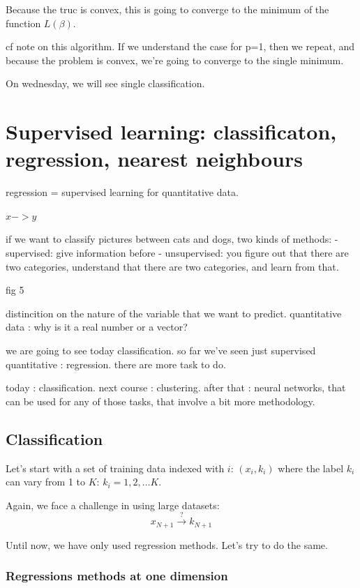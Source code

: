 \documentclass[a4paper]{tufte-book}
\begin{document}
Because the truc is convex, this is going to converge to the minimum of the function $L(\beta)$.

cf note on this algorithm. If we understand the case for p=1, then we repeat,
and because the problem is convex, we're going to converge to the single minimum.

On wednesday, we will see single classification.

\chapter{Supervised learning: classificaton, regression, nearest neighbours}
\label{ch:supervised-learning}

regression = supervised learning for quantitative data.

$x->y$

if we want to classify pictures between cats and dogs, two kinds of methods:
- supervised: give information before
- unsupervised: you figure out that there are two categories, understand that
there are two categories, and learn from that.

fig 5

distincition on the nature of the variable that we want to predict.
quantitative data : why is it a real number or a vector?

we are going to see today classification. so far we've seen just supervised
quantitative : regression. there are more task to do.

today : classification.
next course : clustering.
after that : neural networks, that can be used for any of those tasks, that
involve a bit more methodology.


\section{Classification}

Let's start with a set of training data indexed with $i$:  $(x_i,k_i)$ where the
label $k_i$ can vary from 1 to $K$: $k_i = 1, 2, \ldots K$.

Again, we face a challenge in using large datasets:
\begin{equation}
    x_{N+1} \xrightarrow{?} k_{N+1}
\end{equation}

Until now, we have only used regression methods. Let's try to do the same.

\subsection{Regressions methods at one dimension}
\end{document}
